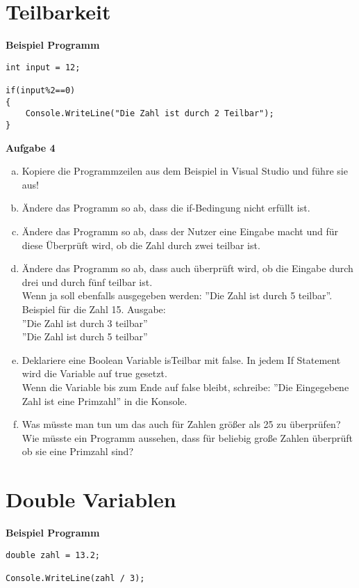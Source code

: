 \documentclass[a4paper,12pt]{article}
\newcommand{\Aufgabe}[1]{
  {
  \vspace*{0.5cm}
  \textsf{\textbf{Aufgabe #1}}
  \vspace*{0.2cm}
  
  }
}
\newcommand{\Definition}[1]{
  {
  \vspace*{0.5cm}
  \textsf{\textbf{#1}}
  \vspace*{0.2cm}
  
  }
}
\begin{document}
\section{Teilbarkeit}
\Definition{Beispiel Programm}

\begin{verbatim}
int input = 12;

if(input%2==0)
{
    Console.WriteLine("Die Zahl ist durch 2 Teilbar");
}
\end{verbatim}

\Aufgabe{4} 
\begin{enumerate}[a)]
\item
Kopiere die Programmzeilen aus dem Beispiel in Visual Studio und führe sie aus!
\item 
Ändere das Programm so ab, dass die if-Bedingung nicht erfüllt ist.
\item
Ändere das Programm so ab, dass der Nutzer eine Eingabe macht und für diese Überprüft wird, ob die Zahl durch zwei teilbar ist.
\item
Ändere das Programm so ab, dass auch überprüft wird, ob die Eingabe durch drei und durch fünf teilbar ist. \\
Wenn ja soll ebenfalls ausgegeben werden: ''Die Zahl ist durch 5 teilbar''. \\
Beispiel für die Zahl 15. Ausgabe: \\
''Die Zahl ist durch 3 teilbar'' \\
''Die Zahl ist durch 5 teilbar'' \\
\item
Deklariere eine Boolean Variable isTeilbar mit false. In jedem If Statement wird die Variable auf true gesetzt. \\
Wenn die Variable bis zum Ende auf false bleibt, schreibe: ''Die Eingegebene Zahl ist eine Primzahl'' 
in die Konsole.
\item
Was müsste man tun um das auch für Zahlen größer als 25 zu überprüfen? \\
Wie müsste ein Programm aussehen, dass für beliebig große Zahlen überprüft ob sie eine Primzahl sind?
\end{enumerate}

\section{Double Variablen}
\Definition{Beispiel Programm}

\begin{verbatim}
double zahl = 13.2;

Console.WriteLine(zahl / 3);
\end{verbatim}
\end{document}
